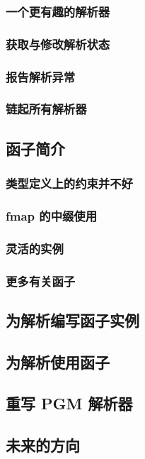\documentclass[./main.tex]{subfiles}
\begin{document}
\subsubsection*{一个更有趣的解析器}

\subsubsection*{获取与修改解析状态}

\subsubsection*{报告解析异常}

\subsubsection*{链起所有解析器}

\subsection*{函子简介}

\subsubsection*{类型定义上的约束并不好}

\subsubsection*{fmap 的中缀使用}

\subsubsection*{灵活的实例}

\subsubsection*{更多有关函子}

\subsection*{为解析编写函子实例}

\subsection*{为解析使用函子}

\subsection*{重写 PGM 解析器}

\subsection*{未来的方向}
\end{document}
